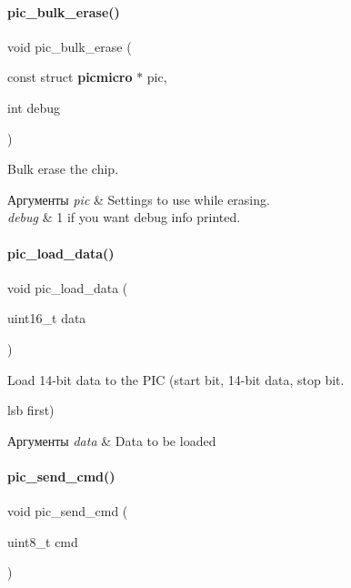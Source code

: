 \paragraph{pic\+\_\+bulk\+\_\+erase()}
{\footnotesize\ttfamily void pic\+\_\+bulk\+\_\+erase (\begin{DoxyParamCaption}\item[{const struct \textbf{ picmicro} $\ast$}]{pic,  }\item[{int}]{debug }\end{DoxyParamCaption})}



Bulk erase the chip. 


\begin{DoxyParams}{Аргументы}
{\em pic} & Settings to use while erasing. \\
\hline
{\em debug} & 1 if you want debug info printed. \\
\hline
\end{DoxyParams}
\mbox{\label{rpp_8c_a9eabf3d3bcbc07384e11819c3130e61c}} 
\paragraph{pic\+\_\+load\+\_\+data()}
{\footnotesize\ttfamily void pic\+\_\+load\+\_\+data (\begin{DoxyParamCaption}\item[{uint16\+\_\+t}]{data }\end{DoxyParamCaption})}



Load 14-\/bit data to the P\+IC (start bit, 14-\/bit data, stop bit. 

lsb first)


\begin{DoxyParams}{Аргументы}
{\em data} & Data to be loaded \\
\hline
\end{DoxyParams}
\mbox{\label{rpp_8c_a8626a982ada1622a98dfb952c037ee2b}} 
\paragraph{pic\+\_\+send\+\_\+cmd()}
{\footnotesize\ttfamily void pic\+\_\+send\+\_\+cmd (\begin{DoxyParamCaption}\item[{uint8\+\_\+t}]{cmd }\end{DoxyParamCaption})}



